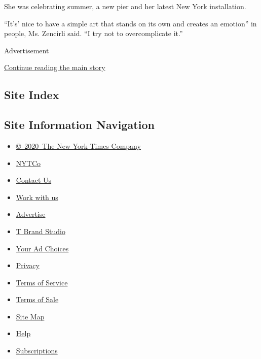 She was celebrating summer, a new pier and her latest New York
installation.

``It's' nice to have a simple art that stands on its own and creates an
emotion'' in people, Ms. Zencirli said. ``I try not to overcomplicate
it.''

Advertisement

\protect\hyperlink{after-bottom}{Continue reading the main story}

\hypertarget{site-index}{%
\subsection{Site Index}\label{site-index}}

\hypertarget{site-information-navigation}{%
\subsection{Site Information
Navigation}\label{site-information-navigation}}

\begin{itemize}
\tightlist
\item
  \href{https://help.nytimes.com/hc/en-us/articles/115014792127-Copyright-notice}{©~2020~The
  New York Times Company}
\end{itemize}

\begin{itemize}
\tightlist
\item
  \href{https://www.nytco.com/}{NYTCo}
\item
  \href{https://help.nytimes.com/hc/en-us/articles/115015385887-Contact-Us}{Contact
  Us}
\item
  \href{https://www.nytco.com/careers/}{Work with us}
\item
  \href{https://nytmediakit.com/}{Advertise}
\item
  \href{http://www.tbrandstudio.com/}{T Brand Studio}
\item
  \href{https://www.nytimes.com/privacy/cookie-policy\#how-do-i-manage-trackers}{Your
  Ad Choices}
\item
  \href{https://www.nytimes.com/privacy}{Privacy}
\item
  \href{https://help.nytimes.com/hc/en-us/articles/115014893428-Terms-of-service}{Terms
  of Service}
\item
  \href{https://help.nytimes.com/hc/en-us/articles/115014893968-Terms-of-sale}{Terms
  of Sale}
\item
  \href{https://spiderbites.nytimes.com}{Site Map}
\item
  \href{https://help.nytimes.com/hc/en-us}{Help}
\item
  \href{https://www.nytimes.com/subscription?campaignId=37WXW}{Subscriptions}
\end{itemize}
